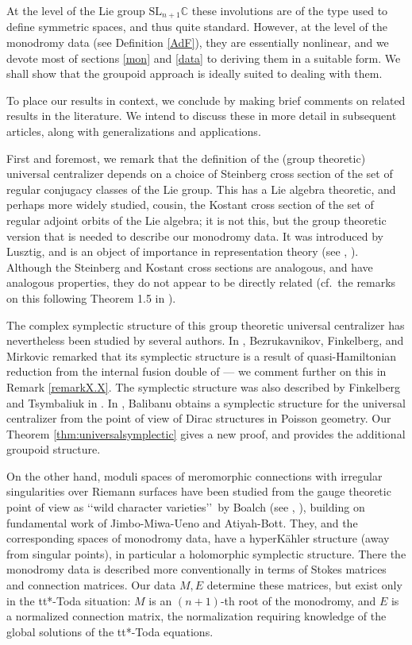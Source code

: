 \documentclass[a4paper,12pt,leqno]{amsart}
\numberwithin{equation}{section}
\theoremstyle{plain}
\theoremstyle{definition}
\newcommand{\C}{\mathbb C}
\newcommand{\SL}{\textrm{SL}}
\renewcommand{\ll}{\lq\lq}
\newcommand{\rr}{\rq\rq\ }
\begin{document}
At the level of the Lie group $\SL_{n+1}\C$ these involutions are of the type used
to define symmetric spaces, and thus quite standard. However,
at the level of the monodromy data (see
Definition \ref{AdF}), they are essentially nonlinear, and we devote most of sections \ref{mon} and \ref{data} to deriving them in a suitable form.
We shall show that the
groupoid approach is ideally suited to dealing with them.

To place our results in context, we conclude by making brief comments on related results in the literature. We intend to discuss these in more detail in subsequent articles, along with generalizations and applications.

First and foremost, we remark that the definition of the
(group theoretic)
universal centralizer depends on a choice of Steinberg cross section of the set of regular conjugacy classes of the Lie group.  This has a Lie algebra theoretic, and perhaps more widely studied, cousin, the Kostant cross section of the set of regular adjoint orbits of the Lie algebra; it is not this, but the
group theoretic version that is needed to describe our monodromy data.
It was introduced by Lusztig, and is
an object of importance in representation theory (see \cite{Lu76}, \cite{Gi18}).
Although the Steinberg and Kostant cross sections are analogous, and have
analogous properties, they do not appear to be directly
related (cf.\ the remarks on this following Theorem 1.5 in \cite{St65}).

The complex symplectic structure of this group theoretic
universal centralizer
has nevertheless been studied by several authors. In \cite{BFM},
Bezrukavnikov, Finkelberg, and Mirkovic remarked that its symplectic structure is a result of
quasi-Hamiltonian reduction from the internal fusion double of \cite{AMM} --- we
comment further on this in Remark \ref{remarkX.X}.
The symplectic structure was also described
by Finkelberg and Tsymbaliuk in \cite{FiTs19}.
In \cite{Ba22}, Balibanu obtains
a symplectic structure
for the universal centralizer
from the point of view of Dirac structures in Poisson geometry.
Our Theorem \ref{thm:universalsymplectic}
gives a new proof, and provides the additional groupoid structure.

On the other hand, moduli spaces of meromorphic connections with irregular singularities over Riemann surfaces have been studied from the gauge theoretic point of view as \ll wild character varieties\rr by
Boalch
(see \cite{Bo01}, \cite{Bo07}),
building on fundamental work of Jimbo-Miwa-Ueno and Atiyah-Bott.  They, and
the corresponding spaces of monodromy data,  have a hyperK\"ahler structure (away from singular points), in particular a holomorphic symplectic structure.   There the monodromy data is described more conventionally in terms of Stokes matrices and connection matrices. Our data $M,E$ determine these matrices, but exist only in the tt*-Toda situation: $M$ is an $(n+1)$-th root of the monodromy, and $E$ is a normalized connection matrix, the normalization requiring knowledge of the global solutions of the tt*-Toda equations.
\end{document}
